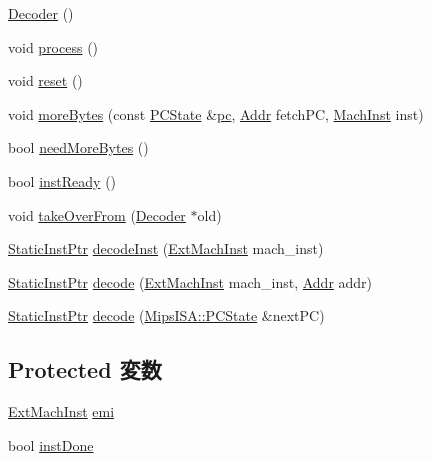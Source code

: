 \begin{DoxyCompactItemize}
\item 
\hyperlink{classMipsISA_1_1Decoder_aedfa2b7d97ed17b14903ed75d6214c78}{Decoder} ()
\item 
void \hyperlink{classMipsISA_1_1Decoder_a2e9c5136d19b1a95fc427e0852deab5c}{process} ()
\item 
void \hyperlink{classMipsISA_1_1Decoder_ad20897c5c8bd47f5d4005989bead0e55}{reset} ()
\item 
void \hyperlink{classMipsISA_1_1Decoder_a85a99c8dd9425508bee9a17836dbbd12}{moreBytes} (const \hyperlink{classGenericISA_1_1DelaySlotPCState}{PCState} \&\hyperlink{namespaceMipsISA_a70af401addf580de8d9ddd8af1165481}{pc}, \hyperlink{classm5_1_1params_1_1Addr}{Addr} fetchPC, \hyperlink{namespaceMipsISA_a301c22ea09fa33dcfe6ddf22f203699c}{MachInst} inst)
\item 
bool \hyperlink{classMipsISA_1_1Decoder_a35631c47fc45b69ca30e6551f9f5d1d1}{needMoreBytes} ()
\item 
bool \hyperlink{classMipsISA_1_1Decoder_a9f6a0bc8946ca58d5d59a5dbc6a3181f}{instReady} ()
\item 
void \hyperlink{classMipsISA_1_1Decoder_a83393f90e7cbd98eda9721ba6022d0e0}{takeOverFrom} (\hyperlink{classMipsISA_1_1Decoder}{Decoder} $\ast$old)
\item 
\hyperlink{classRefCountingPtr}{StaticInstPtr} \hyperlink{classMipsISA_1_1Decoder_a148768e0e9062eb41f604040d0ea86e6}{decodeInst} (\hyperlink{namespaceMipsISA_aec686c38e40c7f794f1435591c15c275}{ExtMachInst} mach\_\-inst)
\item 
\hyperlink{classRefCountingPtr}{StaticInstPtr} \hyperlink{classMipsISA_1_1Decoder_a4ed948f8d08575cc2916fe32154ea69d}{decode} (\hyperlink{namespaceMipsISA_aec686c38e40c7f794f1435591c15c275}{ExtMachInst} mach\_\-inst, \hyperlink{classm5_1_1params_1_1Addr}{Addr} addr)
\item 
\hyperlink{classRefCountingPtr}{StaticInstPtr} \hyperlink{classMipsISA_1_1Decoder_aafd5f445d783c8fe7f2ebbe211486a80}{decode} (\hyperlink{classGenericISA_1_1DelaySlotPCState}{MipsISA::PCState} \&nextPC)
\end{DoxyCompactItemize}
\subsection*{Protected 変数}
\begin{DoxyCompactItemize}
\item 
\hyperlink{namespaceMipsISA_aec686c38e40c7f794f1435591c15c275}{ExtMachInst} \hyperlink{classMipsISA_1_1Decoder_abf211faf305b89c9093b00b6b82b0bd1}{emi}
\item 
bool \hyperlink{classMipsISA_1_1Decoder_a37c5d55785204b8fd00a8ebf62e1fc33}{instDone}
\end{DoxyCompactItemize}
